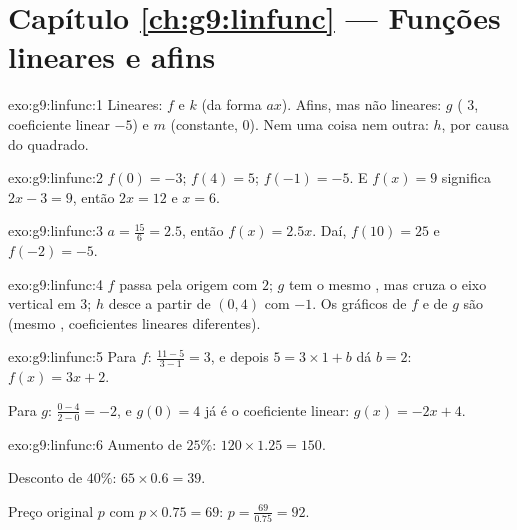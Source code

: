 \section*{Capítulo \ref{ch:g9:linfunc} --- Funções lineares e afins}

\begin{solution}{exo:g9:linfunc:1}
Lineares: $f$ e $k$ (da forma $ax$). Afins, mas não lineares: $g$
( $3$, coeficiente linear $-5$) e $m$ (constante,
 $0$). Nem uma coisa nem outra: $h$, por causa do
quadrado.
\end{solution}

\begin{solution}{exo:g9:linfunc:2}
$f(0) = -3$; $f(4) = 5$; $f(-1) = -5$. E $f(x) = 9$ significa
$2x - 3 = 9$, então $2x = 12$ e $x = 6$.
\end{solution}

\begin{solution}{exo:g9:linfunc:3}
$a = \frac{15}{6} = 2.5$, então $f(x) = 2.5x$. Daí, $f(10) = 25$ e
$f(-2) = -5$.
\end{solution}

\begin{solution}{exo:g9:linfunc:4}
$f$ passa pela origem com  $2$; $g$ tem o mesmo
, mas cruza o eixo vertical em $3$; $h$ desce a
partir de $(0, 4)$ com  $-1$. Os gráficos de $f$ e
de $g$ são \emph{} (mesmo ,
coeficientes lineares diferentes).
\end{solution}

\begin{solution}{exo:g9:linfunc:5}
Para $f$:  $\frac{11 - 5}{3 - 1} = 3$, e depois
$5 = 3 \times 1 + b$ dá $b = 2$: $f(x) = 3x + 2$.

Para $g$:  $\frac{0 - 4}{2 - 0} = -2$, e $g(0) = 4$
já é o coeficiente linear: $g(x) = -2x + 4$.
\end{solution}

\begin{solution}{exo:g9:linfunc:6}
Aumento de $25\%$: $120 \times 1.25 = 150$.

Desconto de $40\%$: $65 \times 0.6 = 39$.

Preço original $p$ com $p \times 0.75 = 69$:
$p = \frac{69}{0.75} = 92$.
\end{solution}

